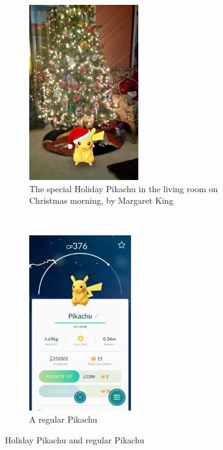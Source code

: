 \begin{figure}[h]
	\centering
	\begin{subfigure}[t]{0.45\textwidth}
		\centering
		\includegraphics[height=3in]{Figures/pogo-holiday-pikachu-margaret-king}
		\caption{The special Holiday Pikachu in the living room on Christmas morning, by Margaret King}
	\end{subfigure}
	~
	\begin{subfigure}[t]{0.45\textwidth}
		\centering
		\includegraphics[height=3in]{Figures/pogo-regular-pikachu}
		\caption{A regular Pikachu}
	\end{subfigure}
	\caption{Holiday Pikachu and regular Pikachu}
\end{figure}

